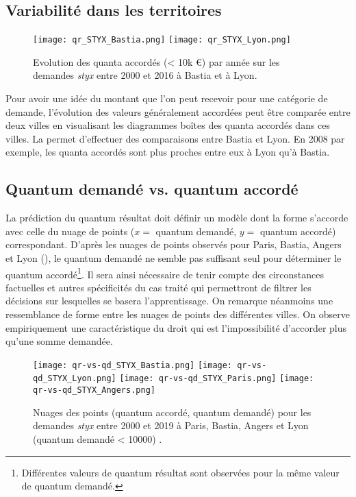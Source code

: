 \subsection{Variabilité dans les territoires}

\begin{figure}[!htb]
	\centering 
	\texttt{[image: qr\_STYX\_Bastia.png]}
	\texttt{[image: qr\_STYX\_Lyon.png]}
	\caption{Evolution des quanta accordés (< 10k \euro) par année sur les demandes \textit{styx} entre 2000 et 2016 à Bastia et à Lyon.}\label{fig:demo:evolution-qr-styx-compare-ville}
\end{figure}

Pour avoir une idée du montant que l'on peut recevoir pour une catégorie de demande, l'évolution des valeurs généralement accordées peut être comparée entre deux villes en visualisant les diagrammes boîtes
des quanta accordés dans ces villes. La   permet d'effectuer des comparaisons entre Bastia et Lyon. En 2008 par exemple, les quanta accordés sont plus proches entre eux à Lyon qu'à Bastia.


\subsection{Quantum demandé vs. quantum accordé}
La prédiction du quantum résultat doit définir un modèle dont la forme s'accorde avec celle du nuage de points ($x=$ quantum demandé, $y=$ quantum accordé) correspondant. D'après les nuages de points observés pour Paris, Bastia, Angers et Lyon (), le quantum demandé ne semble pas suffisant seul pour déterminer le quantum accordé\footnote{Différentes valeurs de quantum résultat sont observées pour la même valeur de quantum demandé.}. Il sera ainsi nécessaire de tenir compte des circonstances factuelles et autres spécificités du cas traité qui permettront de filtrer les décisions sur lesquelles se basera l'apprentissage. On remarque néanmoins une ressemblance de forme entre les nuages de points des différentes villes. On observe empiriquement une caractéristique du droit qui est \og l'impossibilité d'accorder plus qu'une somme demandée\fg{}.

\begin{figure}[!htb]
	\centering 
	\texttt{[image: qr-vs-qd\_STYX\_Bastia.png]}
	\texttt{[image: qr-vs-qd\_STYX\_Lyon.png]}
	\texttt{[image: qr-vs-qd\_STYX\_Paris.png]}
	\texttt{[image: qr-vs-qd\_STYX\_Angers.png]}
	\caption{Nuages des points (quantum accordé, quantum demandé) pour les demandes \textit{styx} entre 2000 et 2019 à Paris, Bastia, Angers et Lyon (quantum demandé < 10000) .}\label{fig:demo:qr-vs-qd-styx-compare-ville}
\end{figure}

